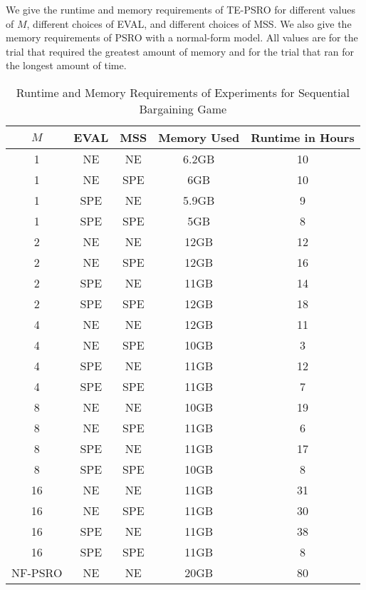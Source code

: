 We give the runtime and memory requirements of TE-PSRO for different values of $M$, different choices of EVAL, and different choices of MSS. We also give the memory requirements of PSRO with a normal-form model. All values are for the trial that required the greatest amount of memory and for the trial that ran for the longest amount of time.

\begin{table}[h!]
    \centering
    \bgroup
    \def\arraystretch{1.1}
    \begin{tabular}{|c|c|c|c|c|}
    \hline
         $M$ & EVAL & MSS & Memory Used & Runtime in Hours \\
          \hline
        1 & NE & NE & 6.2GB & 10\\
        1 & NE & SPE & 6GB & 10\\
        1 & SPE & NE & 5.9GB & 9\\
        1 & SPE & SPE & 5GB & 8\\
        \hline
        2 & NE & NE & 12GB & 12\\
        2 & NE & SPE & 12GB & 16\\
        2 & SPE & NE & 11GB & 14\\
        2 & SPE & SPE & 12GB & 18\\
        \hline
        4 & NE & NE & 12GB & 11\\
        4 & NE & SPE & 10GB & 3\\
        4 & SPE & NE & 11GB & 12\\
        4 & SPE & SPE & 11GB & 7\\
        \hline
        8 & NE & NE & 10GB & 19\\
        8 & NE & SPE & 11GB & 6\\
        8 & SPE & NE & 11GB & 17 \\
        8 & SPE & SPE & 10GB & 8\\
        \hline
        16 & NE & NE & 11GB & 31\\
        16 & NE & SPE & 11GB & 30\\
        16 & SPE & NE & 11GB & 38\\
        16 & SPE & SPE & 11GB & 8\\
        \hline
        NF-PSRO & NE & NE & 20GB & 80\\
        \hline
    \end{tabular}
    \egroup
    \vspace{1em}
    \caption{Runtime and Memory Requirements of Experiments for Sequential Bargaining Game}
    \label{tab:great_lakes}
\end{table}